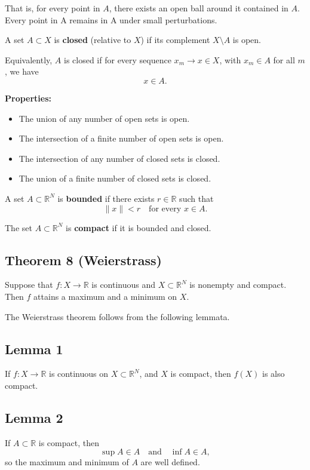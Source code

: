 That is, for every point in $A$, there exists an open ball around it
contained in $A$. Every point in A remains in A under small perturbations.

\medskip

A set $A \subset X$ is \textbf{closed} (relative to $X$) if its complement
$X \setminus A$ is open.

Equivalently, $A$ is closed if for every sequence $x_m \to x \in X$,
with $x_m \in A$ for all $m$, we have
\[
x \in A.
\]

\medskip

\textbf{Properties:}
\begin{itemize}
    \item The union of any number of open sets is open.
    \item The intersection of a finite number of open sets is open.
    \item The intersection of any number of closed sets is closed.
    \item The union of a finite number of closed sets is closed.
\end{itemize}

\vspace{10pt}

A set $A \subset \mathbb{R}^N$ is \textbf{bounded} if there exists $r \in \mathbb{R}$
such that
\[
\|x\| < r \quad \text{for every } x \in A.
\]

The set $A \subset \mathbb{R}^N$ is \textbf{compact} if it is bounded and closed.


\begin{tcolorbox}[breakable, colback=white]

\subsection*{Theorem 8 (Weierstrass)}

Suppose that $f : X \to \mathbb{R}$ is continuous and $X \subset \mathbb{R}^N$
is nonempty and compact. Then $f$ attains a maximum and a minimum on $X$.



\vspace{1em}

The Weierstrass theorem follows from the following lemmata.

\subsection*{Lemma 1}

If $f : X \to \mathbb{R}$ is continuous on $X \subset \mathbb{R}^N$, and $X$ is compact,
then $f(X)$ is also compact.

\subsection*{Lemma 2}

If $A \subset \mathbb{R}$ is compact, then
\[
\sup A \in A \quad \text{and} \quad \inf A \in A,
\]
so the maximum and minimum of $A$ are well defined.

\end{tcolorbox}

